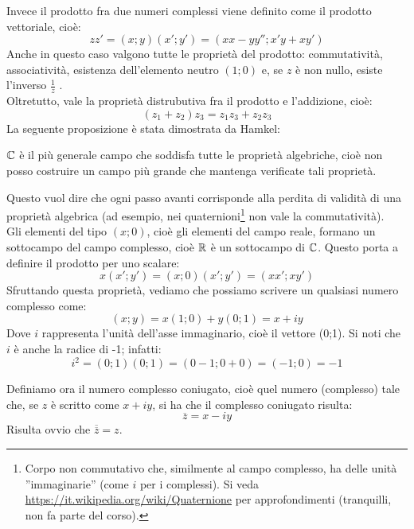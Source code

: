 Invece il prodotto fra due numeri complessi viene definito come il prodotto vettoriale, cioè:
$$zz'=(x;y)(x';y')=(xx-yy'';x'y+xy')$$
Anche in questo caso valgono tutte le proprietà del prodotto: commutatività, associatività, esistenza dell'elemento neutro $(1;0)$ e, se $z$ è non nullo, esiste l'inverso $\frac {1}{z}$ .
\\
Oltretutto, vale la proprietà distrubutiva fra il prodotto e l'addizione, cioè:
\begin{equation}
(z_1 +z_2 )z_3 =z_1 z_3 + z_2 z_3
\end{equation}
La seguente proposizione è stata dimostrata da Hamkel:
\begin{teorema}
$\mathbb{C}$  è il più generale campo che soddisfa tutte le proprietà algebriche, cioè non posso costruire un campo più grande che mantenga verificate tali proprietà.
\end{teorema}
Questo vuol dire che ogni passo avanti corrisponde alla perdita di validità di una proprietà algebrica (ad esempio, nei quaternioni\footnote{Corpo non commutativo che, similmente al campo complesso, ha delle unità ''immaginarie'' (come $i$ per i complessi). Si veda \url{https://it.wikipedia.org/wiki/Quaternione} per approfondimenti (tranquilli, non fa parte del corso).} non vale la commutatività).
\\
Gli elementi del tipo $(x;0)$, cioè gli elementi del campo reale, formano un sottocampo del campo complesso, cioè $\mathbb{R}$ è un sottocampo di $\mathbb{C}$. Questo porta a definire il prodotto per uno scalare:
\begin{equation}
x(x';y')=(x;0) (x';y')=(xx';xy')
\end{equation}
Sfruttando questa proprietà, vediamo che possiamo scrivere un qualsiasi numero complesso come:
\begin{equation}
(x;y)=x(1;0)+y(0;1)=x+iy
\end{equation}
Dove $i$ rappresenta l'unità dell'asse immaginario, cioè il vettore (0;1). Si noti che $i$ è anche la radice di -1; infatti:
$$i^2=(0;1) (0;1)=(0-1;0+0)=(-1;0)=-1$$

Definiamo ora il numero complesso coniugato, cioè quel numero (complesso) tale che, se $z$ è scritto come $x+iy$, si ha che il complesso coniugato risulta:
\begin{equation}
\overline{z}=x-iy
\end{equation}
Risulta ovvio che $\overline{\overline{z}}=z$.

